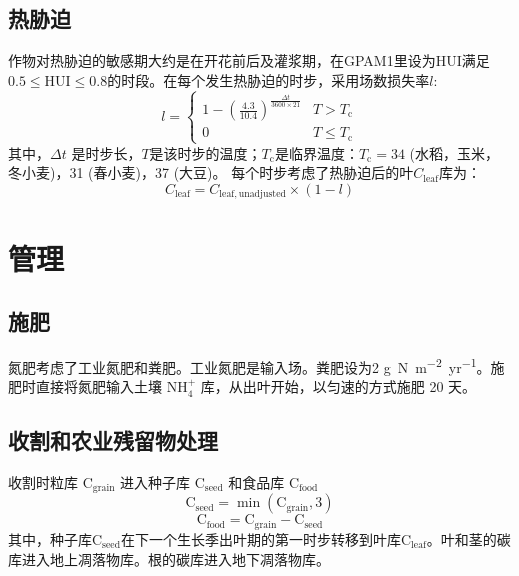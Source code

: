 \subsection{热胁迫}
作物对热胁迫的敏感期大约是在开花前后及灌浆期，在GPAM1里设为${\mathrm {HUI}} $满足$0.5 \leqslant {\mathrm {HUI}} \leqslant 0.8$的时段。在每个发生热胁迫的时步，采用场数损失率$l$:
\begin{equation}
  l=\left\{\begin{array}{cc}1-\left(\frac{4.3}{10.4}\right)^{\frac{\Delta t}{3600\times 21}} & T>T_{\mathrm{c}} \\ 0 & T \leqslant T_{\mathrm{c}}\end{array}\right.
\end{equation}
其中，$\Delta t$ 是时步长，$T$是该时步的温度；$T_{\mathrm {c}} $是临界温度：$T_{\mathrm {c}} =34$ \textcelsius (水稻，玉米，冬小麦)，31 \textcelsius (春小麦)，37 \textcelsius (大豆)。
每个时步考虑了热胁迫后的叶$C_{\mathrm{leaf}}$库为：
\begin{equation}
  C_{\mathrm{leaf}}=C_{\mathrm{leaf,  {unadjusted}}} \times (1-l)
\end{equation}


\section{管理}
\subsection{施肥}
氮肥考虑了工业氮肥和粪肥。工业氮肥是输入场。粪肥设为2 \unit{g.N.m^{−2}.yr^{−1}}。施肥时直接将氮肥输入土壤 $\mathrm{NH_4^+}$ 库，从出叶开始，以匀速的方式施肥 20 天。

\subsection{收割和农业残留物处理}
收割时粒库 $\mathrm{C_{\mathrm{grain}}}$ 进入种子库 $\mathrm{C_{\mathrm{seed}}}$ 和食品库 $\mathrm{C_{\mathrm{food}}}$
\begin{equation}
  \mathrm{{C}_{\mathrm{seed}}}=\min \left(\mathrm{C_{\mathrm{grain}}}, 3\right)
\end{equation}
\begin{equation}
  \mathrm{C_{\mathrm{food}}}=\mathrm{C_{\mathrm{grain}}}-\mathrm{C_{\mathrm{seed}}}
\end{equation}
其中，种子库$\mathrm{C_{\mathrm{seed}}}$在下一个生长季出叶期的第一时步转移到叶库$\mathrm{C_{\mathrm{leaf}}}$。叶和茎的碳库进入地上凋落物库。根的碳库进入地下凋落物库。


